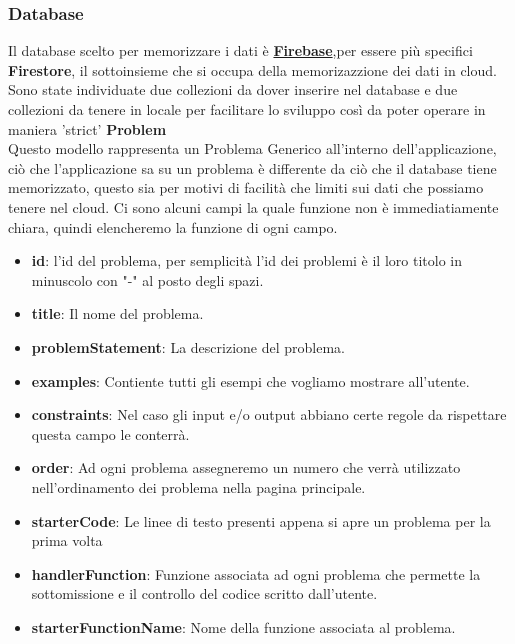 \documentclass[11pt, a4paper]{article}
\theoremstyle{definition}
\begin{document}
\subsubsection{Database}
Il database scelto per memorizzare i dati è \href{https://firebase.google.com}{\textbf{Firebase}},per essere più specifici \textbf{Firestore}, il sottoinsieme che si occupa della memorizazzione dei dati in cloud.
Sono state individuate due collezioni da dover inserire nel database e due collezioni da tenere in locale per facilitare lo sviluppo così da poter operare in maniera 'strict'
\newpage
\textbullet   \textbf{ Problem}\\
Questo modello rappresenta un Problema Generico all'interno dell'applicazione, ciò che l'applicazione sa su un problema è differente da ciò che il database tiene memorizzato, questo sia per motivi di facilità che limiti sui dati che possiamo tenere nel cloud.
Ci sono alcuni campi la quale funzione non è immediatiamente chiara, quindi elencheremo la funzione di ogni campo.
\begin{itemize}
  \item \textbf{id}: l'id del problema, per semplicità l'id dei problemi è il loro titolo in minuscolo con "-" al posto degli spazi.
  \item \textbf{title}: Il nome del problema.
  \item \textbf{problemStatement}: La descrizione del problema.
  \item \textbf{examples}: Contiente tutti gli esempi che vogliamo mostrare all'utente.
  \item \textbf{constraints}: Nel caso gli input e/o output abbiano certe regole da rispettare questa campo le conterrà.
  \item \textbf{order}: Ad ogni problema assegneremo un numero che verrà utilizzato nell'ordinamento dei problema nella pagina principale.
  \item \textbf{starterCode}: Le linee di testo presenti appena si apre un problema per la prima volta
  \item \textbf{handlerFunction}: Funzione associata ad ogni problema che permette la sottomissione e il controllo del codice scritto dall'utente.
  \item \textbf{starterFunctionName}: Nome della funzione associata al problema.
\end{itemize}
\end{document}
